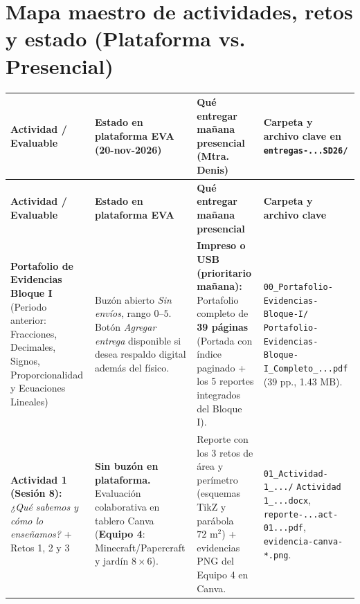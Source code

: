 \documentclass[spanish,letterpaper,oneside]{article}
\begin{document}
\section{Mapa maestro de actividades, retos y estado (Plataforma vs. Presencial)}

{\footnotesize\begin{longtable}{|>{\raggedright\arraybackslash}p{}|>{\raggedright\arraybackslash}p{}|>{\raggedright\arraybackslash}p{}|>{\raggedright\arraybackslash}p{}|}\hline
\rowcolor{iiiepeNavy}
\color{white}\textbf{Actividad / Evaluable} &
\color{white}\textbf{Estado en plataforma EVA (20-nov-2026)} &
\color{white}\textbf{Qué entregar mañana presencial (Mtra. Denis)} &
\color{white}\textbf{Carpeta y archivo clave en \texttt{entregas-...SD26/}} \\\hline
\endfirsthead\hline
\rowcolor{iiiepeNavy}
\color{white}\textbf{Actividad / Evaluable} &
\color{white}\textbf{Estado en plataforma EVA} &
\color{white}\textbf{Qué entregar mañana presencial} &
\color{white}\textbf{Carpeta y archivo clave} \\\hline
\endhead

\textbf{Portafolio de Evidencias Bloque I} (Periodo anterior: Fracciones, Decimales, Signos, Proporcionalidad y Ecuaciones Lineales) &
Buzón abierto \textit{Sin envíos}, rango $0\text{--}5$. Botón \textit{Agregar entrega} disponible si desea respaldo digital además del físico. &
\textbf{Impreso o USB (prioritario mañana):} Portafolio completo de \textbf{39 páginas} (Portada con índice paginado + los 5 reportes integrados del Bloque I). &
\texttt{00\_Portafolio-}\newline
\texttt{Evidencias-Bloque-I/}\newline
\texttt{Portafolio-Evidencias-}\newline
\texttt{Bloque-I\_Completo\_...pdf}\newline
(39 pp., 1.43 MB). \\\hline

\textbf{Actividad 1 (Sesión 8):} \textit{¿Qué sabemos y cómo lo enseñamos?} + Retos 1, 2 y 3 &
\textbf{Sin buzón en plataforma.} Evaluación colaborativa en tablero Canva (\textbf{Equipo 4}: Minecraft/Papercraft y jardín $8\times 6$). &
Reporte con los 3 retos de área y perímetro (esquemas TikZ y parábola $72\text{ m}^2$) + evidencias PNG del Equipo 4 en Canva. &
\texttt{01\_Actividad-1\_.../}\newline
\texttt{Actividad 1\_...docx},\newline
\texttt{reporte-...act-01...pdf},\newline
\texttt{evidencia-canva-*.png}. \\\hline


\end{longtable}}
\end{document}
